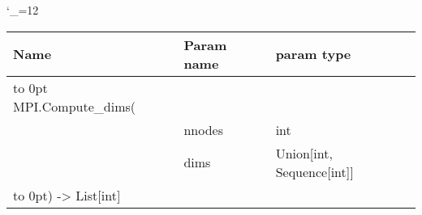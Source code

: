 \begingroup \catcode`\_=12 \tt
\begin{tabular}{lll}
\toprule
\textrm{Name}&\textrm{Param name}&\textrm{param type}\\
\midrule
\hbox to 0pt {MPI.Compute_dims(\hss}\\
& nnodes & int\\
& dims & Union[int, Sequence[int]]\\
\hbox to 0pt{) -> List[int]\hss}\\
\bottomrule
\end{tabular}
\endgroup
